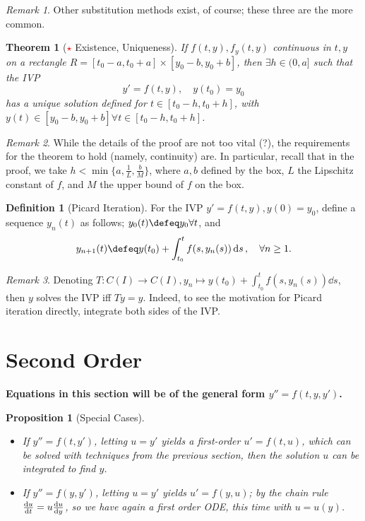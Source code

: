\documentclass[12pt, oneside]{article}
\theoremstyle{definition}
\newtheorem{defn}{Definition}
\theoremstyle{plain}
\newtheorem{thm}{Theorem}
\newtheorem{prop}{Proposition}
\theoremstyle{remark}
\newtheorem{remark}{Remark}
\let\origsection=\section
\renewcommand\section[1]{\origsection{#1}\label{sec:\thesection}}
\begin{document}
\begin{remark}
  Other substitution methods exist, of course; these three are the more common.
\end{remark}

\begin{thm}[\textcolor{red}{$\star$} Existence, Uniqueness]
  If $f(t, y), f_y(t, y)$ continuous in $t, y$ on a rectangle $R = [t_0 - a, t_0 + a] \times [y_0 - b, y_0 + b]$, then $\exists h \in (0, a]$ such that the IVP \[
  y' = f(t, y), \quad y(t_0) = y_0  
  \]
  has a unique solution defined for $t \in [t_0 - h, t_0 + h]$, with $y(t) \in [y_0 - b, y_0 + b] \forall t \in [t_0 - h, t_0 + h]$.
\end{thm}

\begin{remark}
While the details of the proof are not too vital (?), the requirements for the theorem to hold (namely, continuity) are. In particular, recall that in the proof, we take $h < \min \{a, \frac{1}{L}, \frac{b}{M}\}$, where $a, b$ defined by the box, $L$ the Lipschitz constant of $f$, and $M$ the upper bound of $f$ on the box. 
\end{remark}

\begin{defn}[Picard Iteration]
  For the IVP $y' = f(t, y), y(0) = y_0$, define a sequence $y_n(t)$ as follows; $y_0(t) \defeq y_0 \forall t$, and \[
  y_{n+1}(t)  \defeq y(t_0) + \int_{t_0}^t f(s, y_{n}(s)) \dd{s}, \quad \forall n \geq 1.
  \]
\end{defn}
\begin{remark}
  Denoting $T : C(I) \to C(I), y_{n} \mapsto y(t_0) + \int_{t_0}^t f(s, y_{n}(s)) \dd{s}$, then $y$ solves the IVP iff $Ty = y$. Indeed, to see the motivation for Picard iteration directly, integrate both sides of the IVP.
\end{remark}
\section{Second Order}
\textbf{Equations in this section will be of the general form $y'' = f(t, y, y')$.}
\begin{prop}[Special Cases]
  \begin{itemize}
    \item If $y'' = f(t, y')$, letting $u = y'$ yields a first-order $u' = f(t, u)$, which can be solved with techniques from the previous section, then the solution $u$ can be integrated to find $y$.
    \item If $y'' = f(y, y')$, letting $u = y'$ yields $u' = f(y, u)$; by the chain rule $\dv{u}{t} = u \dv{u}{y}$, so we have again a first order ODE, this time with $u = u(y)$.
  \end{itemize}
\end{prop}
\end{document}
